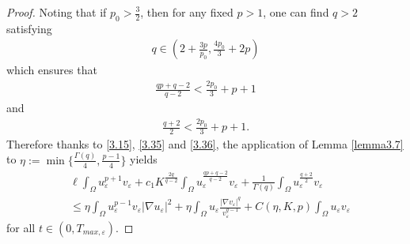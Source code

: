 \documentclass[12pt]{article}
\theoremstyle{plain}
\theoremstyle{definition}
\numberwithin{equation}{section}
\begin{document}
\begin{proof}
     Noting that  if $p_0>\frac{3}{2}$, then for any  fixed $p>1$, one can find $q>2$ satisfying
\begin{align}\label{3.34}
    q\in \left( 2+\frac{3p}{p_0},\frac{4p_0}{3}+2p \right)
\end{align}
which ensures that
\begin{align}\label{3.35}
    \frac{qp+q-2}{q-2}<\frac{2p_0}{3}+p+1
\end{align}
and
\begin{align}\label{3.36}
  \frac{q+2}{2}<\frac{2p_0}{3}+p+1.
\end{align}
Therefore thanks to \eqref{3.15}, \eqref{3.35} and \eqref{3.36}, the application of Lemma \ref{lemma3.7} to $\eta:=\min\{\frac{\Gamma(q)} 4, \frac{p-1}4\}$  yields
\begin{align}\label{3.37}
   &\ell\int_{\Omega}u_{\varepsilon}^{p+1}v_{\varepsilon}+c_1K^{\frac{2q}{q-2}}\int_{\Omega}u_{\varepsilon}^{\frac{qp+q-2}{q-2}}v_{\varepsilon}+\frac{1}{\Gamma(q)}\int_{\Omega}u_{\varepsilon}^{\frac{q+2}{2}}v_{\varepsilon}\nonumber
   \\
   &\leq\eta\int_{\Omega}u_{\varepsilon}^{p-1}v_{\varepsilon}|\nabla u_{\varepsilon}|^2+\eta\int_{\Omega}u_{\varepsilon}\frac{|\nabla
   v_{\varepsilon}|^q}{v_{\varepsilon}^{q-1}}+C(\eta,K,p)\int_{\Omega}u_{\varepsilon}v_{\varepsilon}
\end{align}
for all $t\in (0,T_{max,\varepsilon})$.


\end{proof}
\end{document}
